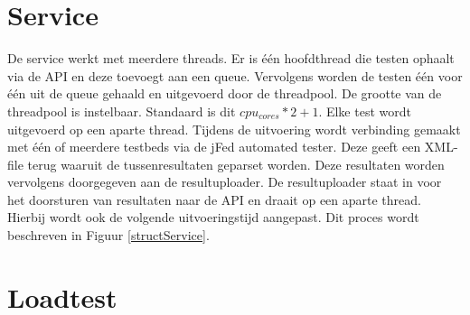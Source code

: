 \section{Service}
\npar
De service werkt met meerdere threads. Er is \'e\'en hoofdthread die testen ophaalt via de API en deze toevoegt aan een queue. Vervolgens worden de testen \'e\'en voor \'e\'en uit de queue gehaald en uitgevoerd door de threadpool. De grootte van de threadpool is instelbaar. Standaard is dit $cpu_{cores} * 2 + 1$.
\npar
Elke test wordt uitgevoerd op een aparte thread. Tijdens de uitvoering wordt verbinding gemaakt met \'e\'en of meerdere testbeds via de jFed automated tester. Deze geeft een XML-file terug waaruit de tussenresultaten geparset worden. Deze resultaten worden vervolgens doorgegeven aan de resultuploader.
\npar
De resultuploader staat in voor het doorsturen van resultaten naar de API en draait op een aparte thread. Hierbij wordt ook de volgende uitvoeringstijd aangepast. Dit proces wordt beschreven in Figuur \ref{structService}.


\clearpage

\section{Loadtest}
